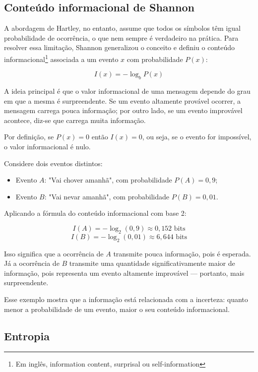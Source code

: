 \subsection{Conteúdo informacional de Shannon}

A abordagem de Hartley, no entanto, assume que todos os símbolos têm igual probabilidade de ocorrência, o que nem sempre é verdadeiro na prática. Para resolver essa limitação, Shannon generalizou o conceito e definiu o conteúdo informacional\footnote{Em inglês, information content, surprisal ou self-information} associada a um evento \( x \) com probabilidade \( P(x) \):

\[
I(x) = -\log_b P(x)
\]

A ideia principal é que o valor informacional de uma mensagem depende do grau em que a mesma é surpreendente. Se um evento altamente provável ocorrer, a mensagem carrega pouca informação; por outro lado, se um evento improvável acontece, diz-se que carrega muita informação. 

Por definição, se \(P(x) = 0\) então \(I(x) = 0\), ou seja, se o evento for impossível, o valor informacional é nulo.

Considere dois eventos distintos:

\begin{itemize}
    \item Evento \( A \): "Vai chover amanhã", com probabilidade \( P(A) = 0{,}9 \);
    \item Evento \( B \): "Vai nevar amanhã", com probabilidade \( P(B) = 0{,}01 \). 
\end{itemize}

Aplicando a fórmula do conteúdo informacional com base 2:

\[
I(A) = -\log_2(0{,}9) \approx 0{,}152 \text{ bits}
\]
\[
I(B) = -\log_2(0{,}01) \approx 6{,}644 \text{ bits}
\]

Isso significa que a ocorrência de \( A \) transmite pouca informação, pois é esperada. Já a ocorrência de \( B \) transmite uma quantidade significativamente maior de informação, pois representa um evento altamente improvável — portanto, mais surpreendente.

Esse exemplo mostra que a informação está relacionada com a incerteza: quanto menor a probabilidade de um evento, maior o seu conteúdo informacional.


\subsection{Entropia}

